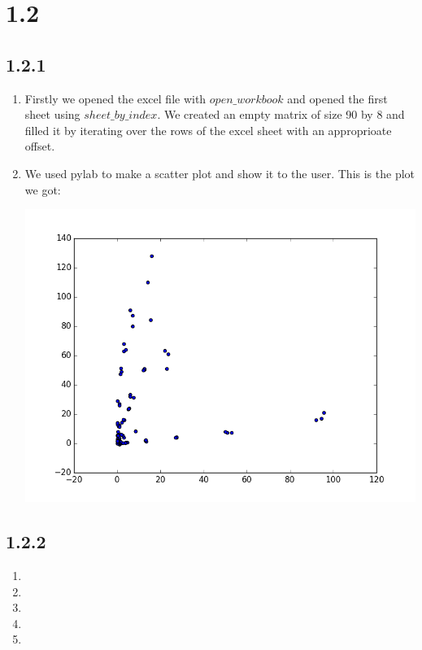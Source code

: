 \documentclass[12pt]{article}
\begin{document}
\section*{1.2}
\subsection*{1.2.1}
\begin{enumerate}[a]
	\item %
	Firstly we opened the excel file with $open\_workbook$ and opened the first sheet using $sheet\_by\_index$. We created an empty matrix of size 90 by 8 and filled it by iterating over the rows of the excel sheet with an approprioate offset.

	\item %
	We used pylab to make a scatter plot and show it to the user. This is the plot we got:

	\includegraphics[width=\textwidth]{plot_1_2_1-b}
\end{enumerate}

\subsection*{1.2.2}
\begin{enumerate}[a]
	\item %
	\item %
	\item %
	\item %
	\item %
\end{enumerate}
\end{document}
